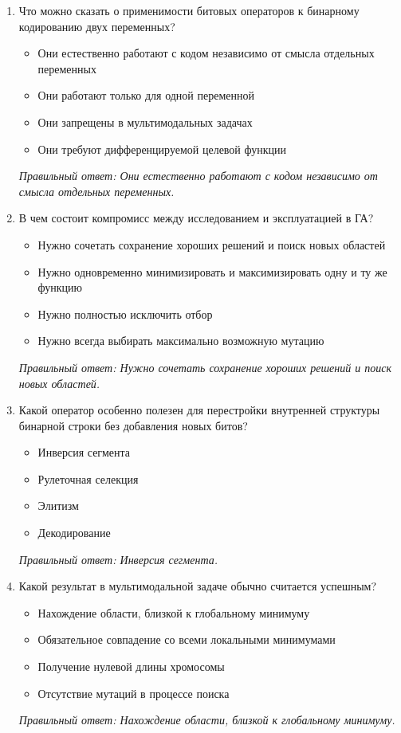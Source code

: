 \begin{enumerate}[label=\textbf{\arabic*.}, leftmargin=0pt, itemsep=1.2em]
\item Что можно сказать о применимости битовых операторов к бинарному кодированию двух переменных?
\begin{itemize}[label=$\square$, leftmargin=1.5cm, itemsep=0.2em, topsep=0.3em]
\item Они естественно работают с кодом независимо от смысла отдельных переменных
\item Они работают только для одной переменной
\item Они запрещены в мультимодальных задачах
\item Они требуют дифференцируемой целевой функции
\end{itemize}
{\small\textit{Правильный ответ: Они естественно работают с кодом независимо от смысла отдельных переменных.}}

\item В чем состоит компромисс между исследованием и эксплуатацией в ГА?
\begin{itemize}[label=$\square$, leftmargin=1.5cm, itemsep=0.2em, topsep=0.3em]
\item Нужно сочетать сохранение хороших решений и поиск новых областей
\item Нужно одновременно минимизировать и максимизировать одну и ту же функцию
\item Нужно полностью исключить отбор
\item Нужно всегда выбирать максимально возможную мутацию
\end{itemize}
{\small\textit{Правильный ответ: Нужно сочетать сохранение хороших решений и поиск новых областей.}}

\item Какой оператор особенно полезен для перестройки внутренней структуры бинарной строки без добавления новых битов?
\begin{itemize}[label=$\square$, leftmargin=1.5cm, itemsep=0.2em, topsep=0.3em]
\item Инверсия сегмента
\item Рулеточная селекция
\item Элитизм
\item Декодирование
\end{itemize}
{\small\textit{Правильный ответ: Инверсия сегмента.}}

\item Какой результат в мультимодальной задаче обычно считается успешным?
\begin{itemize}[label=$\square$, leftmargin=1.5cm, itemsep=0.2em, topsep=0.3em]
\item Нахождение области, близкой к глобальному минимуму
\item Обязательное совпадение со всеми локальными минимумами
\item Получение нулевой длины хромосомы
\item Отсутствие мутаций в процессе поиска
\end{itemize}
{\small\textit{Правильный ответ: Нахождение области, близкой к глобальному минимуму.}}


\end{enumerate}
